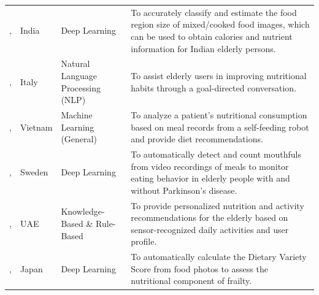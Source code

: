 \begin{longtable}{p{}p{}p{}p{}}
    \addlinespace
    \citeauthor{gautamFoodAssessmentModel2022}, \citeyear{gautamFoodAssessmentModel2022}                                               & India             & Deep Learning                     & To accurately classify and estimate the food region size of mixed/cooked food images, which can be used to obtain calories and nutrient information for Indian elderly persons.                                                        \\
    \addlinespace
    \citeauthor{grecoEmotionalFeaturesInteractions2021}, \citeyear{grecoEmotionalFeaturesInteractions2021}                             & Italy             & Natural Language Processing (NLP) & To assist elderly users in improving nutritional habits through a goal-directed conversation.                                                                                                                                          \\
    \addlinespace
    \citeauthor{haiSelfFeedingRobotElder2022}, \citeyear{haiSelfFeedingRobotElder2022}                                                 & Vietnam           & Machine Learning (General)        & To analyze a patient's nutritional consumption based on meal records from a self-feeding robot and provide diet recommendations.                                                                                                       \\
    \addlinespace
    \citeauthor{ioakeimidisCanBiteDetection2024}, \citeyear{ioakeimidisCanBiteDetection2024}                                           & Sweden            & Deep Learning                     & To automatically detect and count mouthfuls from video recordings of meals to monitor eating behavior in elderly people with and without Parkinson's disease.                                                                          \\
    \addlinespace
    \citeauthor{khattakSelfAdaptiveSystem2016}, \citeyear{khattakSelfAdaptiveSystem2016}                                               & UAE               & Knowledge-Based \& Rule-Based     & To provide personalized nutrition and activity recommendations for the elderly based on sensor-recognized daily activities and user profile.                                                                                           \\
    \addlinespace
    \citeauthor{kobayashiFrailtyMeterHealthy2021}, \citeyear{kobayashiFrailtyMeterHealthy2021}                                         & Japan             & Deep Learning                     & To automatically calculate the Dietary Variety Score from food photos to assess the nutritional component of frailty.                                                                                                                  \\

\end{longtable}
